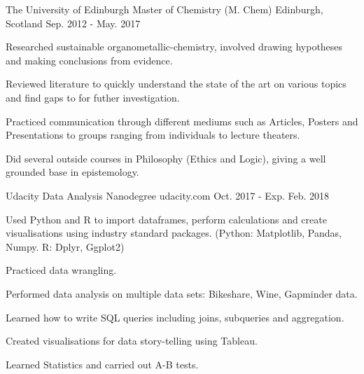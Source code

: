 


\begin{cventries}
  \cventry
    {The University of Edinburgh} %
    {Master of Chemistry (M. Chem)} %
    {Edinburgh, Scotland} %
    {Sep. 2012 - May. 2017} %
    {
      \begin{cvitems} %
        \item {Researched sustainable organometallic-chemistry, involved drawing hypotheses and making conclusions from evidence.}
        \item {Reviewed literature to quickly understand the state of the art on various topics and find gaps to for futher investigation.}
        \item {Practiced communication through different mediums such as Articles, Posters and Presentations to groups ranging from individuals to lecture theaters.}
        \item {Did several outside courses in Philosophy (Ethics and Logic), giving a well grounded base in epistemology.}
      \end{cvitems}
    }

  \cventry
    {Udacity} %
    {Data Analysis Nanodegree} %
    {udacity.com} %
    {Oct. 2017 - Exp. Feb. 2018} %
    {
      \begin{cvitems} %
        \item {Used Python and R to import dataframes, perform calculations and create visualisations using industry standard packages. (Python: Matplotlib, Pandas, Numpy. R: Dplyr, Ggplot2)}
        \item {Practiced data wrangling.}
        \item {Performed data analysis on multiple data sets: Bikeshare, Wine, Gapminder data.}
        \item {Learned how to write SQL queries including joins, subqueries and aggregation.}
        \item {Created visualisations for data story-telling using Tableau.}
        \item {Learned Statistics and carried out A-B tests.}
      \end{cvitems}
    }
\end{cventries}

